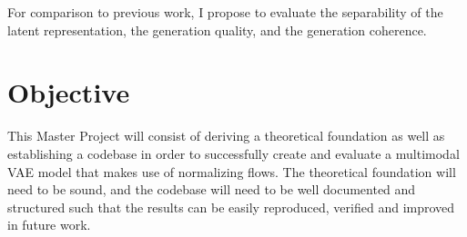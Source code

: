 \documentclass[english]{scrartcl}
\begin{document}
    For comparison to previous work, I propose to evaluate the separability of the latent representation, the generation quality, and the generation coherence.


    \section{Objective}
    This Master Project will consist of deriving a theoretical foundation as well as establishing a codebase in order to successfully create and evaluate a multimodal VAE model that makes use of normalizing flows.
    The theoretical foundation will need to be sound, and the codebase will need to be well documented and structured such that the results can be easily reproduced, verified and improved in future work.

    \printbibliography

%
%
%
\end{document}
